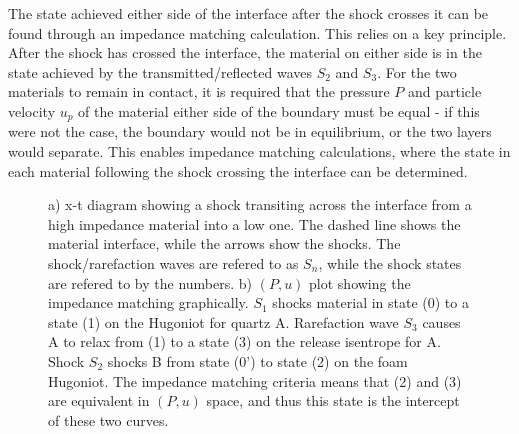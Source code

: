 The state achieved either side of the interface after the shock crosses it can be found through an impedance matching calculation. This relies on a key principle. After the shock has crossed the interface, the material on either side is in the state achieved by the transmitted/reflected waves $S_2$ and $S_3$. For the two materials to remain in contact, it is required that the pressure $P$ and particle velocity $u_p$ of the material either side of the boundary must be equal - if this were not the case, the boundary would not be in equilibrium, or the two layers would separate. This enables impedance matching calculations, where the state in each material following the shock crossing the interface can be determined.

\begin{figure}
\centering     %
{}
\caption{ \label{fig:ShockDiagramAndIMTheory1} a) x-t diagram showing a shock transiting across the interface from a high impedance material into a low one. The dashed line shows the material interface, while the arrows show the shocks. The shock/rarefaction waves are refered to as $S_n$, while the shock states are refered to by the numbers. b) $(P,u)$ plot showing the impedance matching graphically. $S_1$ shocks material in state (0) to a state (1) on the Hugoniot for quartz A. Rarefaction wave $S_3$ causes A to relax from (1) to a state (3) on the release isentrope for A. Shock $S_2$ shocks B from state (0') to state (2) on the foam Hugoniot. The impedance matching criteria means that (2) and (3) are equivalent in $(P,u)$ space, and thus this state is the intercept of these two curves.}
\end{figure}

